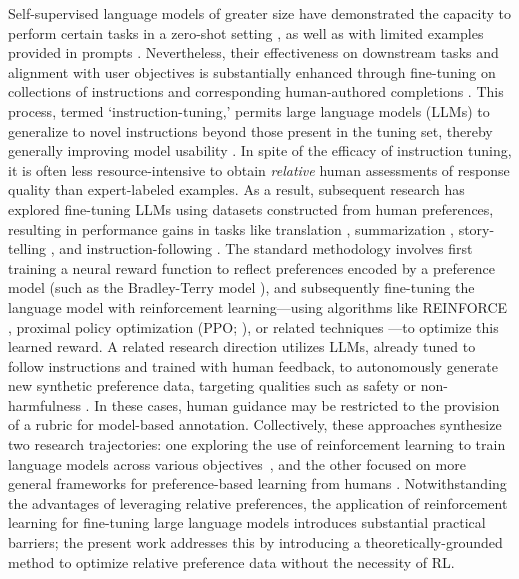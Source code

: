 Self-supervised language models of greater size have demonstrated the capacity to perform certain tasks in a zero-shot setting \citep{radford2019language}, as well as with limited examples provided in prompts \citep{gpt3,megatron,chowdhery2022palm}. Nevertheless, their effectiveness on downstream tasks and alignment with user objectives is substantially enhanced through fine-tuning on collections of instructions and corresponding human-authored completions \citep{mishra-etal-2022-cross,sanh2022multitask,chung2022scaling,thoppilan2022lamda}. This process, termed `instruction-tuning,’ permits large language models (LLMs) to generalize to novel instructions beyond those present in the tuning set, thereby generally improving model usability \citep{chung2022scaling}. In spite of the efficacy of instruction tuning, it is often less resource-intensive to obtain \textit{relative} human assessments of response quality than expert-labeled examples. As a result, subsequent research has explored fine-tuning LLMs using datasets constructed from human preferences, resulting in performance gains in tasks like translation \citep{kreutzer-etal-2018-reliability}, summarization \citep{stiennon2022learning,ziegler2020finetuning}, story-telling \citep{ziegler2020finetuning}, and instruction-following \citep{ouyang2022training,ramamurthy2023is}. The standard methodology involves first training a neural reward function to reflect preferences encoded by a preference model (such as the Bradley-Terry model \citep{bradley1952rankanalysis}), and subsequently fine-tuning the language model with reinforcement learning—using algorithms like REINFORCE \citep{williams1992reinforce}, proximal policy optimization (PPO; \cite{schulman2017proximal}), or related techniques \citep{ramamurthy2023is}—to optimize this learned reward. A related research direction utilizes LLMs, already tuned to follow instructions and trained with human feedback, to autonomously generate new synthetic preference data, targeting qualities such as safety or non-harmfulness \citep{bai2022constitutional}. In these cases, human guidance may be restricted to the provision of a rubric for model-based annotation. Collectively, these approaches synthesize two research trajectories: one exploring the use of reinforcement learning to train language models across various objectives~\citep{Ranzato2015SequenceLT,paulus2018a,wu2018learning}, and the other focused on more general frameworks for preference-based learning from humans \citep{christiano2017deep,kupcsik2018learning}. Notwithstanding the advantages of leveraging relative preferences, the application of reinforcement learning for fine-tuning large language models introduces substantial practical barriers; the present work addresses this by introducing a theoretically-grounded method to optimize relative preference data without the necessity of RL.

